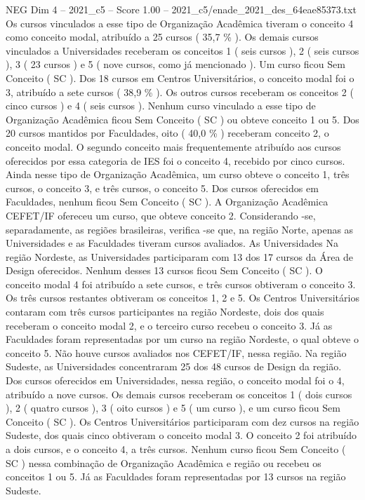 \begin{textsample}{NEG Dim 4 – 2021\_c5 – Score 1.00 – 2021\_c5/enade\_2021\_des\_64eae85373.txt}
Os cursos vinculados a esse tipo de Organização Acadêmica tiveram o conceito 4 como conceito modal, atribuído a 25 cursos ( 35,7 \% ).
Os demais cursos vinculados a Universidades receberam os conceitos 1 ( seis cursos ), 2 ( seis cursos ), 3 ( 23 cursos ) e 5 ( nove cursos, como já mencionado ).
Um curso ficou Sem Conceito ( SC ).
Dos 18 cursos em Centros Universitários, o conceito modal foi o 3, atribuído a sete cursos ( 38,9 \% ).
Os outros cursos receberam os conceitos 2 ( cinco cursos ) e 4 ( seis cursos ).
Nenhum curso vinculado a esse tipo de Organização Acadêmica ficou Sem Conceito ( SC ) ou obteve conceito 1 ou 5.
Dos 20 cursos mantidos por Faculdades, oito ( 40,0 \% ) receberam conceito 2, o conceito modal.
O segundo conceito mais frequentemente atribuído aos cursos oferecidos por essa categoria de IES foi o conceito 4, recebido por cinco cursos.
Ainda nesse tipo de Organização Acadêmica, um curso obteve o conceito 1, três cursos, o conceito 3, e três cursos, o conceito 5.
Dos cursos oferecidos em Faculdades, nenhum ficou Sem Conceito ( SC ).
A Organização Acadêmica CEFET/IF ofereceu um curso, que obteve conceito 2.
Considerando -se, separadamente, as regiões brasileiras, verifica -se que, na região Norte, apenas as Universidades e as Faculdades tiveram cursos avaliados.
As Universidades Na região Nordeste, as Universidades participaram com 13 dos 17 cursos da Área de Design oferecidos.
Nenhum desses 13 cursos ficou Sem Conceito ( SC ).
O conceito modal 4 foi atribuído a sete cursos, e três cursos obtiveram o conceito 3.
Os três cursos restantes obtiveram os conceitos 1, 2 e 5.
Os Centros Universitários contaram com três cursos participantes na região Nordeste, dois dos quais receberam o conceito modal 2, e o terceiro curso recebeu o conceito 3.
Já as Faculdades foram representadas por um curso na região Nordeste, o qual obteve o conceito 5.
Não houve cursos avaliados nos CEFET/IF, nessa região.
Na região Sudeste, as Universidades concentraram 25 dos 48 cursos de Design da região.
Dos cursos oferecidos em Universidades, nessa região, o conceito modal foi o 4, atribuído a nove cursos.
Os demais cursos receberam os conceitos 1 ( dois cursos ), 2 ( quatro cursos ), 3 ( oito cursos ) e 5 ( um curso ), e um curso ficou Sem Conceito ( SC ).
Os Centros Universitários participaram com dez cursos na região Sudeste, dos quais cinco obtiveram o conceito modal 3.
O conceito 2 foi atribuído a dois cursos, e o conceito 4, a três cursos.
Nenhum curso ficou Sem Conceito ( SC ) nessa combinação de Organização Acadêmica e região ou recebeu os conceitos 1 ou 5.
Já as Faculdades foram representadas por 13 cursos na região Sudeste.

\end{textsample}

